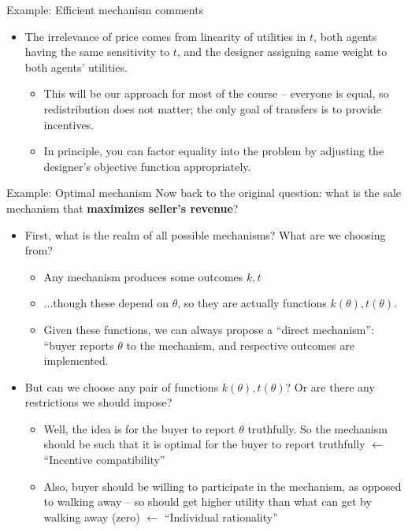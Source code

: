\documentclass[english,10pt
,aspectratio=169
]{beamer}
\begin{document}
\begin{frame}{Example: Efficient mechanism comments}
	\begin{itemize}
		\item The irrelevance of price comes from linearity of utilities in $t$, both agents having the same sensitivity to $t$, and the designer assigning same weight to both agents' utilities.
		\begin{itemize}
			\item This will be our approach for most of the course -- everyone is equal, so redistribution does not matter; the only goal of transfers is to provide incentives.
			\item In principle, you can factor equality into the problem by adjusting the designer's objective function appropriately.
		\end{itemize}
	\end{itemize}
\end{frame}


\begin{frame}{Example: Optimal mechanism}
	Now back to the original question: what is the sale mechanism that \textbf{maximizes seller's revenue}?
	\pause
	
	\begin{itemize}
		\item First, what is the realm of all possible mechanisms? What are we choosing from?
		\pause
		\begin{itemize}
			\item Any mechanism produces some outcomes $k,t$
			\item ...though these depend on $\theta$, so they are actually functions $k(\theta),t(\theta)$.
			\item Given these functions, we can always propose a ``direct mechanism'': ``buyer reports $\theta$ to the mechanism, and respective outcomes are implemented.
		\end{itemize}
		
		\pause
		\item But can we choose any pair of functions $k(\theta),t(\theta)$? Or are there any restrictions we should impose?
		\pause
		\begin{itemize}
			\item Well, the idea is for the buyer to report $\theta$ truthfully. So the mechanism should be such that it is optimal for the buyer to report truthfully \alert{$\leftarrow$ ``Incentive compatibility''}
			\item Also, buyer should be willing to participate in the mechanism, as opposed to walking away -- so should get higher utility than what can get by walking away (zero) \alert{$\leftarrow$ ``Individual rationality''}
		\end{itemize}
	\end{itemize}
\end{frame}
\end{document}
